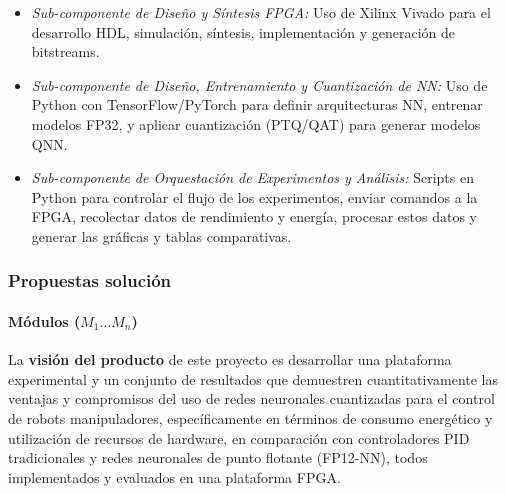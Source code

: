 \documentclass[12pt]{article}
\begin{document}
\begin{itemize}
        \begin{itemize}
            \item \textit{Sub-componente de Diseño y Síntesis FPGA:} Uso de Xilinx Vivado para el desarrollo HDL, simulación, síntesis, implementación y generación de bitstreams.
            \item \textit{Sub-componente de Diseño, Entrenamiento y Cuantización de NN:} Uso de Python con TensorFlow/PyTorch para definir arquitecturas NN, entrenar modelos FP32, y aplicar cuantización (PTQ/QAT) para generar modelos QNN.
            \item \textit{Sub-componente de Orquestación de Experimentos y Análisis:} Scripts en Python para controlar el flujo de los experimentos, enviar comandos a la FPGA, recolectar datos de rendimiento y energía, procesar estos datos y generar las gráficas y tablas comparativas.
        \end{itemize}
\end{itemize}

\subsubsection{Propuestas solución}
\paragraph{Módulos ($M_1 \dots M_n$)}
\label{sssec:vision_solucion_scrum}

La \textbf{visión del producto} de este proyecto es desarrollar una plataforma experimental y un conjunto de resultados que demuestren cuantitativamente las ventajas y compromisos del uso de redes neuronales cuantizadas para el control de robots manipuladores, específicamente en términos de consumo energético y utilización de recursos de hardware, en comparación con controladores PID tradicionales y redes neuronales de punto flotante (FP12-NN), todos implementados y evaluados en una plataforma FPGA.
\end{document}
